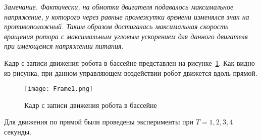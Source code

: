 \textit{Замечание. Фактически, на обмотки двигателя подавалось максимальное напряжение, у которого через равные промежутки времени изменялся знак на противоположный. Таким образом достигалась максимальная скорость вращения ротора с максимальным угловым ускорением для данного двигателя при имеющемся напряжении питания.}

Кадр с записи движения робота в бассейне представлен на рисунке~\ref{Frame1}. Как видно из рисунка, при данном управляющем воздействии робот движется вдоль прямой.

\begin{figure}[!ht]
	\centering
	\texttt{[image: Frame1.png]}
	\caption{Кадр с записи движения робота в бассейне}
	\label{Frame1}
\end{figure}

%	
%	





%			




Для движения по прямой были проведены эксперименты при $ T = 1, 2, 3, 4 $ секунды.


